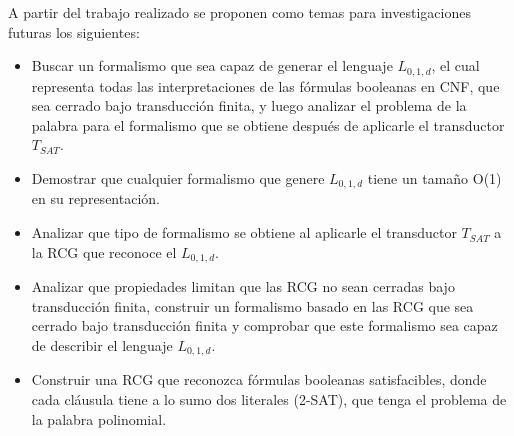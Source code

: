 \begin{recomendations}
    A partir del trabajo realizado se proponen como temas para investigaciones futuras los
    siguientes:
    
    \begin{itemize}
        \item Buscar un formalismo que sea capaz de generar el lenguaje $L_{0,1,d}$, el cual representa todas las interpretaciones
              de las fórmulas booleanas en CNF, que sea cerrado bajo transducción finita, y luego analizar el problema de la palabra para
              el formalismo que se obtiene después de aplicarle el transductor $T_{SAT}$.
        \item Demostrar que cualquier formalismo que genere $L_{0,1,d}$ tiene un tamaño O(1) en su representación.
        \item Analizar que tipo de formalismo se obtiene al aplicarle el transductor $T_{SAT}$ a la RCG que reconoce
              el $L_{0,1,d}$.
        \item  Analizar que propiedades limitan que las RCG no sean cerradas bajo transducción finita, construir
              un formalismo basado en las RCG que sea cerrado bajo transducción finita y comprobar que este formalismo
              sea capaz de describir el lenguaje $L_{0,1,d}$.
        \item Construir una RCG que reconozca fórmulas booleanas satisfacibles, donde cada cláusula tiene a lo sumo dos literales (2-SAT),
              que tenga el problema de la palabra polinomial.
    \end{itemize}
    
\end{recomendations}
